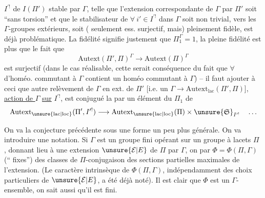 $I^{\prime!}$ de $I(\Pi')$ stable par $\Gamma$, telle que l'extension correspondante de $\Gamma$ par $\Pi'$ soit ``sans torsion'' et que le stabilisateur de $\forall\ i'\in I^{\prime!}$ dans $\Gamma$ soit non trivial, vers les $\Gamma$-groupes extérieurs, soit ( seulement ess. surjectif, mais) pleinement fidèle, est déjà problématique. La fidélité signifie justement que $\Pi_1^\Gamma=1$, la pleine fidélité est plus  que le fait que 
\[
\mathrm{Autext}(\Pi',\Pi)^\Gamma\longrightarrow\mathrm{Autext}(\Pi)^\Gamma
\]
est surjectif (dans le cas réalisable, cette  serait conséquence du fait que $\forall$  d'homéo. commutant à $\Gamma$ contient un homéo commutant à $\Gamma$)
-- il faut ajouter à ceci que  autre relèvement de $\Gamma$ en  ext. de $\Pi'$ [i.e. un $\Gamma\longrightarrow\mathrm{Autext}_{\mathrm{lac}}(\Pi',\Pi)$],    \uline{action de $\Gamma$} \uline{sur} $I^{\prime!}$, est conjugué  la 
 par un élément du  $\Pi_1$ de
\[
\mathrm{Autext}_{\unsure{\mathrm{lac}|\mathrm{loc}}}(\Pi',I^{\prime!})
\longrightarrow
\mathrm{Autext}_{\unsure{\mathrm{lac}|\mathrm{loc}}}(\Pi)
\times \unsure{\mathfrak S}_{I^{\prime!}}\quad\ldots
\]

On va  la conjecture précédente sous une forme un peu plus générale.
On va introduire une notation. Si $\Gamma$ est un groupe fini opérant 
 sur un groupe à lacets $\Pi$ ,
donnant lieu à une extension $\unsure{\mathcal E|E}$ de $\Pi$ par $\Gamma$,
on   par $\Phi=\Phi(\Pi,\Gamma)$ (`` fixes'')
 des classes de $\Pi$-conjugaison des sections partielles
 maximales de l'extension.
(Le caractère intrinsèque de $\Phi(\Pi,\Gamma)$, indépendamment des choix particuliers de $\unsure{\mathcal E|E}$, a été déjà noté).
Il est clair que $\Phi$ est un $\Gamma$-ensemble, on sait aussi qu'il est fini.

